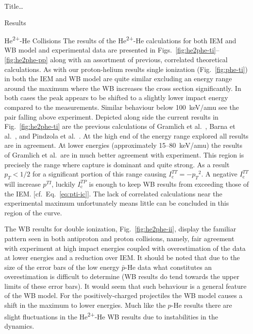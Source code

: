 \documentclass[letterpaper, 11 pt]{report}
\begin{document}
\begin{chapter}{ Title\dots \label{chap:p-he2p-he}}
\begin{section}{Results \label{sec:phe2p-res}}
\begin{subsection}{\texorpdfstring{He\textsuperscript{2+}}{He2+}-He Collisions 
                         \label{sec:he2phe-res}}
         The results of the He\textsuperscript{2+}-He calculations for both IEM and WB model and
         experimental data are presented in Figs.~\ref{fig:he2phe-ti}--\ref{fig:he2phe-pp} along with
         an assortment of previous, correlated theoretical calculations. As with our proton-helium
         results single ionization (Fig.~\ref{fig:phe-ti}) in both the IEM and WB model are quite
         similar excluding an energy range around the maximum where the WB increases the cross section
         significantly. In both cases the peak appears to be shifted to a slightly lower impact energy
         compared to the measurements. Similar behaviour below 100~keV/amu see the pair falling above
         experiment. Depicted along side the current results in Fig.~\ref{fig:he2phe-ti} are the
         previous calculations of Gramlich et al.~\cite{GGS-89}, Barna
         et al.~\cite{BTB-05}, and Pindzola et al.~\cite{PRC-07}. At the high end of
         the energy range explored all results are in agreement. At lower energies (approximately
         15--80~keV/amu) the results of Gramlich et al.\ are in much better agreement with
         experiment. This region is precisely the range where capture is dominant and quite strong. As
         a result $p_T < 1/2$ for a significant portion of this range causing $I^{TT}_\mathrm{c} =
         -{p_T}^2$. A negative $I^{TT}_\mathrm{c}$ will increase $p^{TI}$, luckily $I^{TP}_\mathrm{c}$
         is enough to keep WB results from exceeding those of the IEM. [cf.\ Eq.~\eqref{eq:pti-ic}]. The
         lack of correlated calculations near the experimental maximum unfortunately means little can be
         concluded in this region of the curve.

         The WB results for double ionization, Fig.~\ref{fig:he2phe-ii}, display the familiar pattern
         seen in both antiproton and proton collisions, namely, fair agreement with experiment at high
         impact energies coupled with overestimation of the data at lower energies and a reduction over
         IEM. It should be noted that due to the size of the error bars of the low energy $\bar{p}$-He
         data what constitutes an overestimation is difficult to determine (WB results do tend towards
         the upper limits of these error bars). It would seem that such behaviour is a general feature of
         the WB model. For the positively-charged projectiles the WB model causes a shift in the maximum
         to lower energies. Much like the $p$-He results there are slight fluctuations in the
         He\textsuperscript{2+}-He WB results due to instabilities in the dynamics.


\end{subsection}
\end{section}
\end{chapter}
\end{document}
